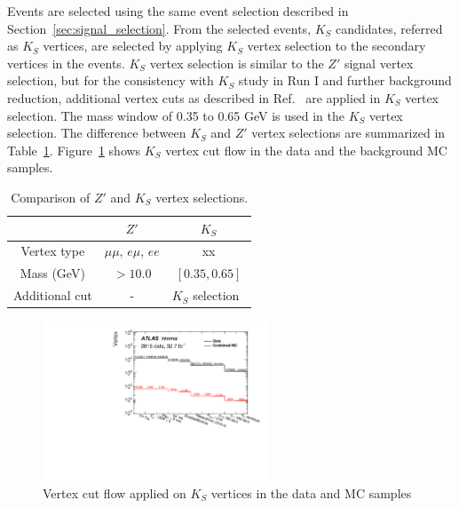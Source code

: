 Events are selected using the same event selection described in Section~\ref{sec:signal_selection}. %
From the selected events, $K_{S}$ candidates, referred as $K_{S}$ vertices, are selected by applying $K_{S}$ vertex selection to the secondary vertices in the events. $K_{S}$ vertex selection is similar to the $Z'$ signal vertex selection, but for the consistency with $K_{S}$ study in Run I and further background reduction, additional vertex cuts as described in Ref.~\cite{Aad:2011hd} are applied in $K_{S}$ vertex selection. The mass window of 0.35 to 0.65 GeV is used in the $K_{S}$ vertex selection. The difference between $K_{S}$ and $Z'$ vertex selections are summarized in Table~\ref{table:ks_vertex_cut}. Figure~\ref{fig:Ks_vertex_cutflow} shows $K_{S}$ vertex cut flow in the data and the background MC samples.

\begin{table}[!htb]
  \centering
  \begin{tabular}{ c c c }
    \hline
    \hline
    & $Z'$& $K_{S}$ \\
    \hline
    Vertex type & $\mu\mu$, $e\mu$, $ee$ & xx \\
    Mass (GeV) & $> 10.0$ & $[0.35,0.65]$ \\
    Additional cut & - & $K_{S}$ selection~\cite{Aad:2011hd} \\
    \hline
    \hline
  \end{tabular}
  \caption{Comparison of $Z'$ and $K_{S}$ vertex selections.}
  \label{table:ks_vertex_cut}
\end{table}

\begin{figure}[!htb]
	\includegraphics[width=0.60\textwidth]{figures/m_syst_Ks_cf.pdf}
	\centering
	\caption{Vertex cut flow applied on $K_{S}$ vertices in the data and MC samples}
	\label{fig:Ks_vertex_cutflow}
\end{figure}

